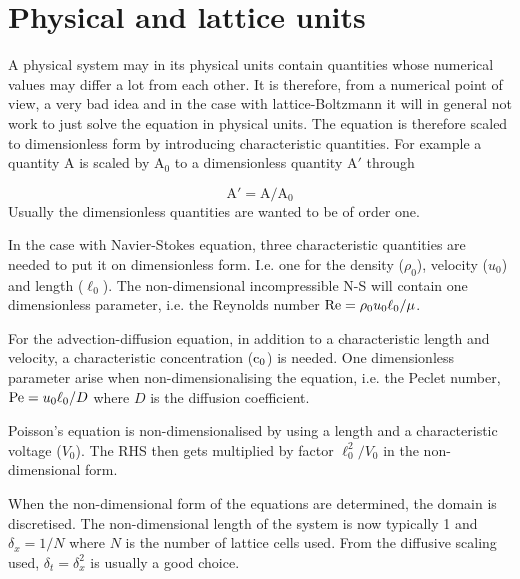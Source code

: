 \section{Physical and lattice units}

A physical system may in its physical units contain quantities whose
numerical values may differ a lot from each other. It is therefore,
from a numerical point of view, a very bad idea and in the case with
lattice-Boltzmann it will in general not work to just solve the
equation in physical units. The equation is therefore scaled to
dimensionless form by introducing characteristic quantities. For
example a quantity A is scaled by A$_0$ to a dimensionless quantity
A$'$ through

\begin{equation}
\mathrm{A}' = \mathrm{A}/\mathrm{A_0} 
\end{equation}
Usually the dimensionless quantities are wanted to be of order one.

In the case with Navier-Stokes equation, three characteristic
quantities are needed to put it on dimensionless form. I.e. one for
the density ($\rho_0$), velocity ($u_0$) and length ($\ell_0$). The
non-dimensional incompressible N-S will contain one dimensionless
parameter, i.e. the Reynolds number $\mathrm{Re} = \rho_0 u_0 \ell_0 / \mu$.

For the advection-diffusion equation, in addition to a characteristic
length and velocity, a characteristic concentration ($\mathrm{c}_0$) is
needed. One dimensionless parameter arise when non-dimensionalising the
equation, i.e. the Peclet number, $\mathrm{Pe} = u_0\ell_0/D$ where $D$ is the
diffusion coefficient. 

Poisson's equation is non-dimensionalised by using a length and a
characteristic voltage ($V_0$). The RHS then gets multiplied by factor
$\ell_0^2/V_0$ in the non-dimensional form.

When the non-dimensional form of the equations are determined, the
domain is discretised. The non-dimensional length of the system is now
typically 1 and $\delta_x = 1/N$ where $N$ is the number of lattice
cells used. From the diffusive scaling used, $\delta_t = \delta_x^2$
is usually a good choice.  
